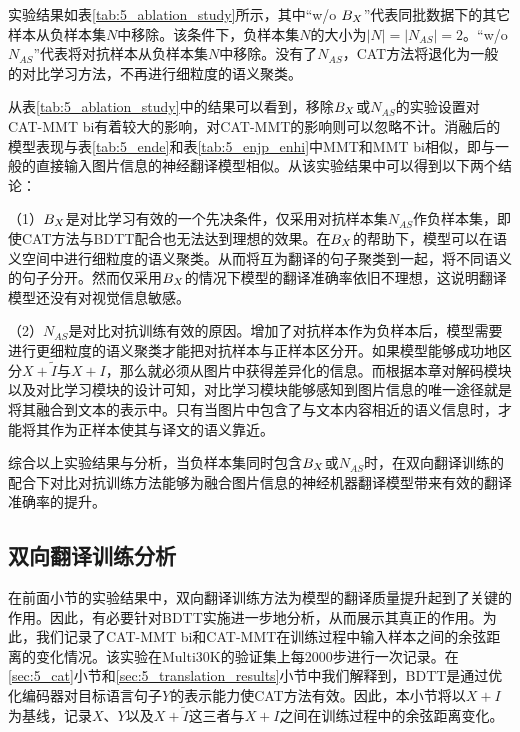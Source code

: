 实验结果如表\ref{tab:5_ablation_study}所示，其中“w/o $B_{\\X}$”代表同批数据下的其它样本从负样本集$N$中移除。该条件下，负样本集$N$的大小为$|N|=|N_{AS}|=2$。“w/o $N_{AS}$”代表将对抗样本从负样本集$N$中移除。没有了$N_{AS}$，CAT方法将退化为一般的对比学习方法，不再进行细粒度的语义聚类。

从表\ref{tab:5_ablation_study}中的结果可以看到，移除$B_{\\X}$或$N_{AS}$的实验设置对CAT-MMT bi有着较大的影响，对CAT-MMT的影响则可以忽略不计。消融后的模型表现与表\ref{tab:5_ende}和表\ref{tab:5_enjp_enhi}中MMT和MMT bi相似，即与一般的直接输入图片信息的神经翻译模型相似。从该实验结果中可以得到以下两个结论：

（1）$B_{\\X}$是对比学习有效的一个先决条件，仅采用对抗样本集$N_{AS}$作负样本集，即使CAT方法与BDTT配合也无法达到理想的效果。在$B_{\\X}$的帮助下，模型可以在语义空间中进行细粒度的语义聚类。从而将互为翻译的句子聚类到一起，将不同语义的句子分开。然而仅采用$B_{\\X}$的情况下模型的翻译准确率依旧不理想，这说明翻译模型还没有对视觉信息敏感。

（2）$N_{AS}$是对比对抗训练有效的原因。增加了对抗样本作为负样本后，模型需要进行更细粒度的语义聚类才能把对抗样本与正样本区分开。如果模型能够成功地区分$X+\tilde{I}$与$X+I$，那么就必须从图片中获得差异化的信息。而根据本章对解码模块以及对比学习模块的设计可知，对比学习模块能够感知到图片信息的唯一途径就是将其融合到文本的表示中。只有当图片中包含了与文本内容相近的语义信息时，才能将其作为正样本使其与译文的语义靠近。

综合以上实验结果与分析，当负样本集同时包含$B_{\\X}$或$N_{AS}$时，在双向翻译训练的配合下对比对抗训练方法能够为融合图片信息的神经机器翻译模型带来有效的翻译准确率的提升。

\subsection{双向翻译训练分析}
\label{sec:5_bdtt_analysis}

在前面小节的实验结果中，双向翻译训练方法为模型的翻译质量提升起到了关键的作用。因此，有必要针对BDTT实施进一步地分析，从而展示其真正的作用。为此，我们记录了CAT-MMT bi和CAT-MMT在训练过程中输入样本之间的余弦距离的变化情况。该实验在Multi30K的验证集上每2000步进行一次记录。在\ref{sec:5_cat}小节和\ref{sec:5_translation_results}小节中我们解释到，BDTT是通过优化编码器对目标语言句子$Y$的表示能力使CAT方法有效。因此，本小节将以$X+I$为基线，记录$X$、$Y$以及$X+\tilde{I}$这三者与$X+I$之间在训练过程中的余弦距离变化。


